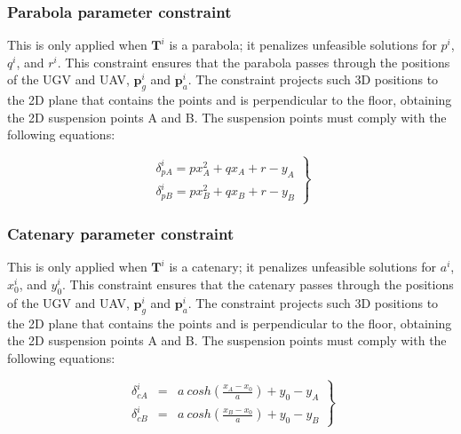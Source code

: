 \subsubsection{Parabola parameter constraint}
This is only applied when $\mathbf{T}^i$ is a parabola; it penalizes unfeasible solutions for $p^{i}$, $q^{i}$, and $r^{i}$. This constraint ensures that the parabola passes through the positions of the UGV and UAV, $\mathbf{p}^i_g$ and $\mathbf{p}^i_a$. The constraint projects such 3D positions to the 2D plane that contains the points and is perpendicular to the floor, obtaining the 2D suspension points A and B. The suspension points must comply with the following equations: 


\begin{equation}
  \label{eq:eq_parameters_parabola}
  \left.
    \begin{array}{lll}
        \delta^i_{pA} = p{x^2_A} + qx_A + r - y_A \\
        \delta^i_{pB} = p{x^2_B} + qx_B + r - y_B 
    \end{array}
    \right\}
\end{equation}


\subsubsection{Catenary parameter constraint}
This is only applied when $\mathbf{T}^i$ is a catenary; it penalizes unfeasible solutions for $a^i$, $x^i_0$, and $y^i_0$. This constraint ensures that the catenary passes through the positions of the UGV and UAV, $\mathbf{p}^i_g$ and $\mathbf{p}^i_a$. The constraint projects such 3D positions to the 2D plane that contains the points and is perpendicular to the floor, obtaining the 2D suspension points A and B. The suspension points must comply with the following equations: 


\begin{equation}
  \label{eq:eq_parameters_catenary}
  \left.
  \begin{array}{lll}
  \delta^i_{cA} &=& a\ cosh(\frac{x_A- x_0}{a}) + y_0 - y_A \\
  \delta^i_{cB} &=& a\ %
  cosh(\frac{x_B- x_0}{a}) + y_0 - y_B
  \end{array}
\right\}
\end{equation}




